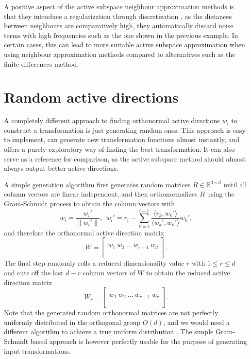 \documentclass[
  a4paper,  %
  twoside,  %
  bibliography=totoc,
  headsepline,
  cleardoublepage=empty,
  parskip=half,
  draft=false
]{scrbook}
\begin{document}
A positive aspect of the active subspace neighbour approximation methods is that they introduce a regularization through discretization \cite{Kress1999}, \ie as the distances between neighbours are comparatively high, they automatically discard noise terms with high frequencies such as the one shown in the previous example.
In certain cases, this can lead to more suitable active subspace approximation when using neighbour approximation methods compared to alternatives such as the finite differences method.

\section{Random active directions}
\label{sec:rt}

A completely different approach to finding orthonormal active directions $w_i$ to construct a transformation is just generating random ones.
This approach is easy to implement, can generate new transformation functions almost instantly, and offers a purely exploratory way of finding the best transformation.
It can also serve as a reference for comparison, as the active subspace method should almost always output better active directions.

A simple generation algorithm first generates random matrices $R \in \mathds{R}^{d \times d}$ until all column vectors are linear independent, and then orthonormalizes $R$ using the Gram-Schmidt process to obtain the column vectors with
\begin{equation}
w_i=\frac{w_i'}{\| w_i' \|},~~ w_i'=r_i - \sum_{k=1}^{i-1} \frac{\langle r_k,  w_k' \rangle}{\langle w_k', w_k' \rangle} w_k',
\end{equation}
and therefore the orthonormal active direction matrix
\begin{equation}
W = \begin{bmatrix}
  \\
    w_1 ~ w_2 ~ \dots ~ w_{r-1} ~ w_d\\
    \\
  \end{bmatrix}.
\end{equation}
%
The final step randomly rolls a reduced dimensionality value $r$ with $1 \leq r \leq d$ and cuts off the last $d-r$ column vectors of $W$ to obtain the reduced active direction matrix
\begin{equation}
W_r = \begin{bmatrix}
  \\
    w_1 ~ w_2 ~ \dots ~ w_{r-1} ~ w_r\\
    \\
  \end{bmatrix}.
\end{equation}
%
Note that the generated random orthonormal matrices are not perfectly uniformly distributed in the orthogonal group $O(d)$, and we would need a different algorithm to achieve a true uniform distribution \cite{Wang2008}.
The simple Gram-Schmidt based approach is however perfectly usable for the purpose of generating input transformations.
\end{document}
